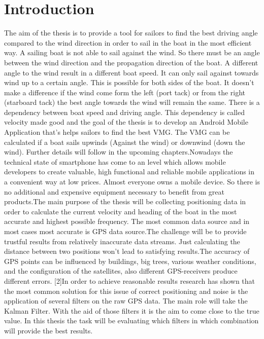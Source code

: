 \chapter{Introduction}
The aim of the thesis is to provide a tool for sailors to find the best driving angle compared to the wind direction in order to sail in the boat in the most efficient way. A sailing boat is not able to sail against the wind. So there must be an angle between the wind direction and the propagation direction of the boat. A different angle to the wind result in a different boat speed. It can only sail against towards wind up to a certain angle. This is possible for both sides of the boat. It doesn't make a difference if the wind come form the left (port tack) or from the right (starboard tack) the best angle towards the wind will remain the same. There is a dependency between boat speed and driving angle. This dependency is called velocity made good and the goal of the thesis is to develop an Android Mobile Application that's helps sailors to find the best VMG. The VMG can be calculated if a boat sails upwinds (Against the wind) or downwind (down the wind). Further details will follow in the upcoming chapters.Nowadays the technical state of smartphone has come to an level which allows mobile developers to create valuable, high functional and reliable mobile applications in a convenient way at low prices. Almost everyone owns a mobile device. So there is no additional and expensive equipment necessary to benefit from great products.The main purpose of the thesis will be collecting positioning data in order to calculate the current velocity and heading of the boat in the most accurate and highest possible frequency. The most common data source and in most cases most accurate is GPS data source.The challenge will be to provide trustful results from relatively inaccurate data streams. Just calculating the distance between two positions won't lead to satisfying results.The accuracy of GPS points can be influenced by buildings, big trees, various weather conditions, and the configuration of the satellites, also different GPS-receivers produce different errors. [2]In order to achieve reasonable results research has shown that the most common solution for this issue of correct positioning and noise is the application of several filters on the raw GPS data. The main role will take the Kalman Filter. With the aid of those filters it is the aim to come close to the true value. In this thesis the task will be evaluating which filters in which combination will provide the best results.



